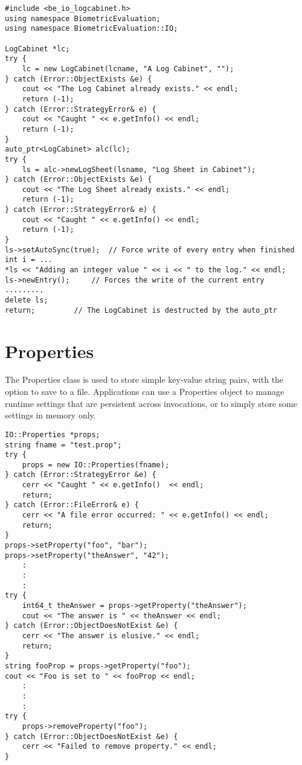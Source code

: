 \lstset{language=c++}
\begin{lstlisting}[caption={Using a LogSheet within a LogCabinet}, label=logcabinetuse]
#include <be_io_logcabinet.h>
using namespace BiometricEvaluation;
using namespace BiometricEvaluation::IO;

LogCabinet *lc;
try {
    lc = new LogCabinet(lcname, "A Log Cabinet", "");
} catch (Error::ObjectExists &e) {
    cout << "The Log Cabinet already exists." << endl;
    return (-1);
} catch (Error::StrategyError& e) {
    cout << "Caught " << e.getInfo() << endl;
    return (-1);
}
auto_ptr<LogCabinet> alc(lc);
try {
    ls = alc->newLogSheet(lsname, "Log Sheet in Cabinet");
} catch (Error::ObjectExists &e) {
    cout << "The Log Sheet already exists." << endl;
    return (-1);
} catch (Error::StrategyError& e) {
    cout << "Caught " << e.getInfo() << endl;
    return (-1);
}
ls->setAutoSync(true);	// Force write of every entry when finished
int i = ...
*ls << "Adding an integer value " << i << " to the log." << endl;
ls->newEntry();		// Forces the write of the current entry
.........
delete ls;
return;			// The LogCabinet is destructed by the auto_ptr
\end{lstlisting}

\section{Properties}
\label{sec-properties}
The Properties class is used to store simple key-value string pairs, with the
option to save to a file. Applications can use a Properties object to manage
runtime settings that are persistent across invocations, or to simply store
some settings in memory only.

\lstset{language=c++}
\begin{lstlisting}[caption={Using a Properties Object}, label=propertiesuse]
IO::Properties *props;
string fname = "test.prop";
try {
    props = new IO::Properties(fname);
} catch (Error::StrategyError &e) {
    cerr << "Caught " << e.getInfo()  << endl;
    return;
} catch (Error::FileError& e) {
    cerr << "A file error occurred: " << e.getInfo() << endl;
    return;
}
props->setProperty("foo", "bar");
props->setProperty("theAnswer", "42");
    :
    :
    :
try {
    int64_t theAnswer = props->getProperty("theAnswer");
    cout << "The answer is " << theAnswer << endl;
} catch (Error::ObjectDoesNotExist &e) {
    cerr << "The answer is elusive." << endl;
    return;
}
string fooProp = props->getProperty("foo");
cout << "Foo is set to " << fooProp << endl;
    :
    :
    :
try {
    props->removeProperty("foo");
} catch (Error::ObjectDoesNotExist &e) {
    cerr << "Failed to remove property." << endl;
}
\end{lstlisting}
